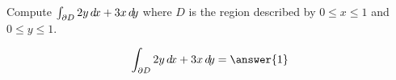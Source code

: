 \documentclass{ximera}
\author{David Guichard \and Neal Koblitz \and H. Jerome Keisler \and Albert Scheller \and Barry Balof \and Mike Wills \and Matthew Carr}
\begin{document}
\begin{exercise}




Compute $\int_{\partial D}2y\mathop{}\!d\! x+3x\mathop{}\!d\! y$ where $D$ is the region described by $0\le x\le 1$ and $0\le y\le 1$. 
 

\begin{prompt}
\[
\int_{\partial D}2y\d x+3x\d y=\answer{1}
\]
\end{prompt}

\end{exercise}
\end{document}
